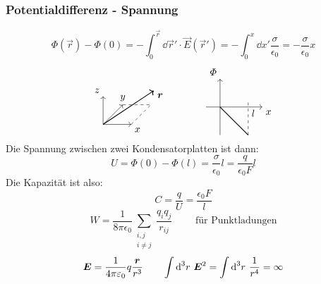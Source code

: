 \subsubsection{Potentialdifferenz - Spannung}
\begin{equation*}
\Phi(\vec{r}) - \Phi(0) = - \int_{0}^{\vec{r}} \dd\vec{r}' \cdot \vec{E} (\vec{r}') = - \int_{0}^{x} \dd x' \frac{\sigma}{\epsilon_0} = - \frac{\sigma}{\epsilon_0} x
\end{equation*}
$$
\begin{tikzpicture}
\draw[->] (0,0) -- (0,1) node[anchor=south east] {$ z $};
\draw[->] (0,0) -- (.7,.7) node[anchor=south] {$ y $};
\draw[->] (0,0) -- (1,0) node[anchor=north west] {$ x $};
\draw[dashed] (.7,.7) -- (.7+1,.7);
\draw[dashed] (1,0) -- (1+.7,.7);
\draw[thick,->] (0,0) -- (1.8,1.2) node[right,yshift=-5pt] {$ \vec{r} $};
\end{tikzpicture}
\qquad \qquad 
\begin{tikzpicture}
\draw[->] (-.5,0) -- (1.5,0) node[anchor=north west] {$ x $};
\draw[->] (0,-1) -- (0,1) node[anchor=south east] {$ \Phi $};
\draw[thick] (0,0) -- (1,-1);
\draw[dashed] (1,-1) -- (1,.2) node[anchor=north west,yshift=-5pt] {$ l $};
\end{tikzpicture}
$$
Die Spannung zwischen zwei Kondensatorplatten ist dann:
\begin{equation*}
U = \Phi(0) - \Phi(l) = \frac{\sigma}{\epsilon_0} l = \frac{q}{\epsilon_0 F} l
\end{equation*}
Die Kapazität ist also:
\begin{equation*}
C = \frac{q}{U} = \frac{\epsilon_0 F}{l}
\end{equation*}
$$W = \frac{1}{8 \pi \epsilon_0} \sum_{\substack{i,j\\ i \neq j}} \frac{q_i q_j}{r_{ij}} \qquad \textrm{ für Punktladungen}$$
$$\bm{E} = \frac{1}{4\pi\varepsilon_0} q \frac{\bm{r}}{r^3} \qquad \int \textrm{d}^3 r\ \bm{E}^2 = \int \textrm{d}^3 r\ \frac{1}{r^4} = \infty$$

